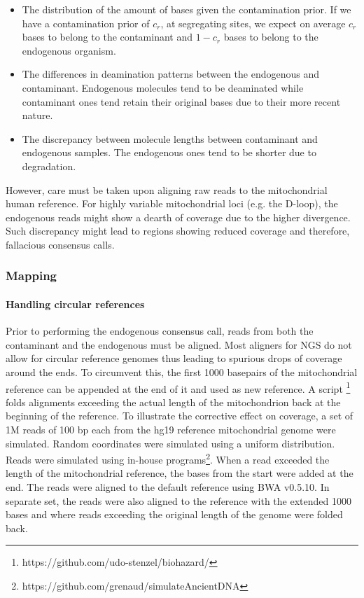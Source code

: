 \documentclass[a4paper,12pt]{article}
\begin{document}


\begin{itemize}
\item The distribution of the amount of bases given the contamination prior. If we have a contamination prior of $c_r$, at segregating sites, we expect on average $c_r$ bases to belong to the contaminant and $1-c_r$ bases to belong to the endogenous organism.
\item The differences in deamination patterns between the endogenous and contaminant. Endogenous molecules tend to be deaminated while contaminant ones tend retain their original bases due to their more recent nature. 
\item The discrepancy between molecule lengths between contaminant and endogenous samples. The endogenous ones tend to be shorter due to degradation.
\end{itemize}

However, care must be taken upon aligning raw reads to the mitochondrial human reference. For highly variable mitochondrial loci (e.g. the D-loop), the endogenous reads might show a dearth of coverage due to the higher divergence. Such discrepancy might lead to regions showing reduced coverage and therefore, fallacious consensus calls.












\subsubsection{Mapping}
\label{sec:methodsmapping}
\noindent \paragraph{Handling circular references}

Prior to performing the endogenous consensus call, reads from both the contaminant and the endogenous must be aligned. Most aligners for NGS do not allow for circular reference genomes thus leading to spurious drops of coverage around the ends. To circumvent this, the first 1000 basepairs  of the mitochondrial reference can be appended at the end of it and used as new reference. A script \footnote{https://github.com/udo-stenzel/biohazard/} folds alignments exceeding the actual length of the mitochondrion back at the beginning of the reference. To illustrate the corrective effect on coverage, a set of 1M reads of 100 bp each from the hg19 reference mitochondrial genome were simulated. Random coordinates were simulated using a uniform distribution. Reads were simulated using in-house programs\footnote{https://github.com/grenaud/simulateAncientDNA}. When a read exceeded the length of the mitochondrial reference, the bases from the start were added at the end. The reads were aligned to the default reference using BWA v0.5.10\cite{li2009fast}.  In separate set, the reads were also aligned to the reference with the extended 1000 bases and where reads exceeding the original length of the genome were folded back. 
\end{document}
